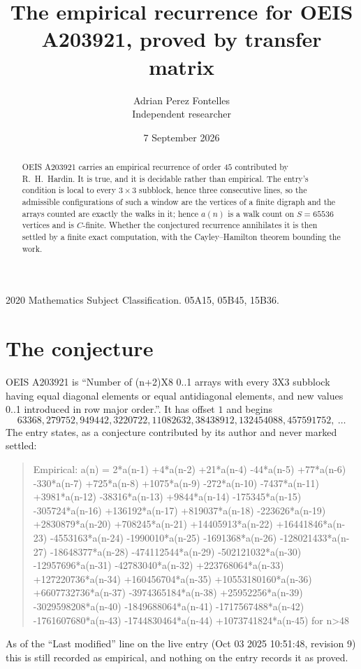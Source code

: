 \documentclass[11pt,a4paper]{article}
\title{The empirical recurrence for OEIS A203921, proved by transfer matrix}
\author{Adrian Perez Fontelles\\ \small Independent researcher}
\date{7 September 2026}
\theoremstyle{plain}
\theoremstyle{definition}
\begin{document}
\maketitle

\begin{abstract}
OEIS A203921 carries an empirical recurrence of order $45$ contributed by R.~H.~Hardin. It is
true, and it is decidable rather than empirical. The entry's condition is local to every $3\times3$ subblock, hence three consecutive lines, so
the admissible configurations of such a window are the vertices of a finite digraph and the
arrays counted are exactly the walks in it; hence $a(n)$ is a walk count on $S=65536$ vertices
and is $C$-finite. Whether the conjectured recurrence annihilates it is then settled by a
finite exact computation, with the Cayley--Hamilton theorem bounding the work.
\end{abstract}

\noindent\small 2020 Mathematics Subject Classification. 05A15, 05B45, 15B36.\normalsize

\section{The conjecture}

OEIS A203921 is ``Number of (n+2)X8 0..1 arrays with every 3X3 subblock having equal diagonal elements or equal antidiagonal elements, and new values 0..1 introduced in row major order.''. It has offset $1$ and begins
\[
63368, 279752, 949442, 3220722, 11082632, 38438912, 132454088, 457591752,\ \dots
\]
The entry states, as a conjecture contributed by its author and never marked settled:
\begin{quote}
Empirical: a(n) = 2*a(n-1) +4*a(n-2) +21*a(n-4) -44*a(n-5) +77*a(n-6) -330*a(n-7) +725*a(n-8) +1075*a(n-9) -272*a(n-10) -7437*a(n-11) +3981*a(n-12) -38316*a(n-13) +9844*a(n-14) -175345*a(n-15) -305724*a(n-16) +136192*a(n-17) +819037*a(n-18) -223626*a(n-19) +2830879*a(n-20) +708245*a(n-21) +14405913*a(n-22) +16441846*a(n-23) -4553163*a(n-24) -1990010*a(n-25) -1691368*a(n-26) -128021433*a(n-27) -18648377*a(n-28) -474112544*a(n-29) -502121032*a(n-30) -12957696*a(n-31) -42783040*a(n-32) +223768064*a(n-33) +127220736*a(n-34) +160456704*a(n-35) +10553180160*a(n-36) +6607732736*a(n-37) -3974365184*a(n-38) +25952256*a(n-39) -3029598208*a(n-40) -1849688064*a(n-41) -1717567488*a(n-42) -1761607680*a(n-43) -1744830464*a(n-44) +1073741824*a(n-45) for n>48
\end{quote}
As of the ``Last modified'' line on the live entry (Oct 03 2025 10:51:48, revision 9) this is still
recorded as empirical, and nothing on the entry records it as proved.
\end{document}
